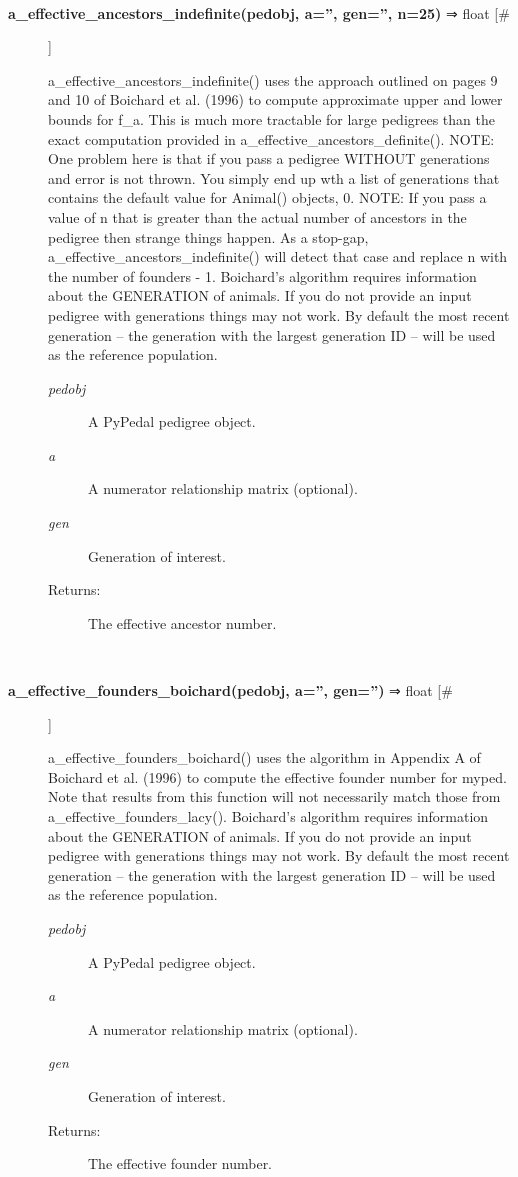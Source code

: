 \documentclass[10pt]{article}
\begin{document}
\begin{description}
\begin{description}
\end{description}
\\ 

\item[\textbf{a\_effective\_ancestors\_indefinite(pedobj, a='', gen='', n=25)}
 ⇒ float [\#]]

 a\_effective\_ancestors\_indefinite() uses the approach outlined on pages 9 and 10 of Boichard et al. (1996) to compute approximate upper and lower bounds for f\_a. This is much more tractable for large pedigrees than the exact computation provided in a\_effective\_ancestors\_definite(). NOTE: One problem here is that if you pass a pedigree WITHOUT generations and error is not thrown. You simply end up wth a list of generations that contains the default value for Animal() objects, 0. NOTE: If you pass a value of n that is greater than the actual number of ancestors in the pedigree then strange things happen. As a stop-gap, a\_effective\_ancestors\_indefinite() will detect that case and replace n with the number of founders - 1. Boichard's algorithm requires information about the GENERATION of animals. If you do not provide an input pedigree with generations things may not work. By default the most recent generation -- the generation with the largest generation ID -- will be used as the reference population.
\begin{description}
\item[\emph{pedobj}
] A PyPedal pedigree object.
\item[\emph{a}
] A numerator relationship matrix (optional).
\item[\emph{gen}
] Generation of interest.
\item[Returns:] The effective ancestor number.

\end{description}
\\ 

\item[\textbf{a\_effective\_founders\_boichard(pedobj, a='', gen='')}
 ⇒ float [\#]]

 a\_effective\_founders\_boichard() uses the algorithm in Appendix A of Boichard et al. (1996) to compute the effective founder number for myped. Note that results from this function will not necessarily match those from a\_effective\_founders\_lacy(). Boichard's algorithm requires information about the GENERATION of animals. If you do not provide an input pedigree with generations things may not work. By default the most recent generation -- the generation with the largest generation ID -- will be used as the reference population.
\begin{description}
\item[\emph{pedobj}
] A PyPedal pedigree object.
\item[\emph{a}
] A numerator relationship matrix (optional).
\item[\emph{gen}
] Generation of interest.
\item[Returns:] The effective founder number.


\end{description}
\end{description}
\end{document}
